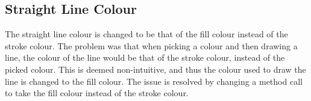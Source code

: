 \subsection{Straight Line Colour}
The straight line colour is changed to be that of the fill colour instead of the stroke colour.
The problem was that when picking a colour and then drawing a line, the colour of the line would be that of the stroke colour, instead of the picked colour.
This is deemed non-intuitive, and thus the colour used to draw the line is changed to the fill colour.
The issue is resolved by changing a method call to take the fill colour instead of the stroke colour.
